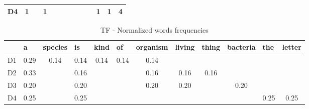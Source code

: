 \begin{itemize}
\begin{table}[ht]
\begin{tabular}{@{}lccccccccccc|c|@{}}
		D4 & 1                     &                             & 1                      &                          &                        &                              &                            &                           &                              & 1                       & 1                           & 4                          \\ \bottomrule
	\end{tabular}
\end{table}
\begin{table}[]
	\centering
	\caption{TF - Normalized words frequencies}
	\label{tf_idf_tf_norm_freq}
	\begin{tabular}{@{}lccccccccccc@{}}
		\toprule
		& \multicolumn{1}{l}{a} & \multicolumn{1}{l}{species} & \multicolumn{1}{l}{is} & \multicolumn{1}{l}{kind} & \multicolumn{1}{l}{of} & \multicolumn{1}{l}{organism} & \multicolumn{1}{l}{living} & \multicolumn{1}{l}{thing} & \multicolumn{1}{l}{bacteria} & \multicolumn{1}{l}{the} & \multicolumn{1}{l}{letter} \\ \midrule
		D1 & 0.29                  & 0.14                        & 0.14                   & 0.14                     & 0.14                   & 0.14                         &                            &                           &                              &                         &                            \\
		D2 & 0.33                  &                             & 0.16                   &                          &                        & 0.16                         & 0.16                       & 0.16                      &                              &                         &                            \\
		D3 & 0.20                  &                             & 0.20                   &                          &                        & 0.20                         & 0.20                       &                           & 0.20                         &                         &                            \\
		D4 & 0.25                  &                             & 0.25                   &                          &                        &                              &                            &                           &                              & 0.25                    & 0.25                       \\ \bottomrule
	\end{tabular}
\end{table}
	

\end{itemize}
